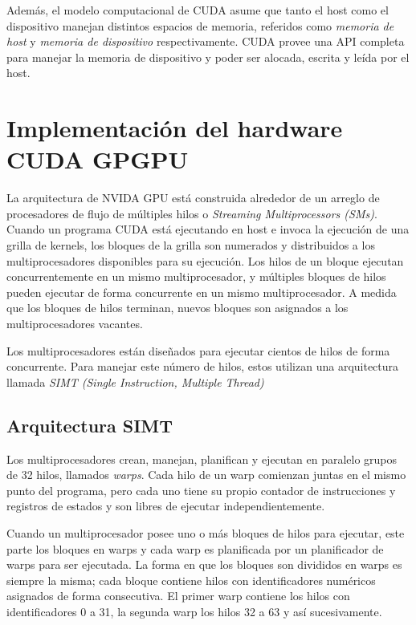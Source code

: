 \documentclass[a4paper,openright,12pt, oneside]{book}
\begin{document}
Adem\'as, el modelo computacional de CUDA asume que tanto el host como el dispositivo
manejan distintos espacios de memoria, referidos como \textit{memoria de host}
y \textit{memoria de dispositivo} respectivamente. CUDA provee una API completa
para manejar la memoria de dispositivo y poder ser alocada, escrita y le\'ida por 
el host.



\section{Implementaci\'on del hardware CUDA GPGPU}

La arquitectura de NVIDA GPU est\'a construida alrededor de un arreglo de
procesadores de flujo de m\'ultiples hilos o \textit{Streaming Multiprocessors (SMs)}.
Cuando un programa CUDA est\'a ejecutando en host e invoca la ejecuci\'on de una grilla
de kernels, los bloques de la grilla son numerados y distribuidos a los multiprocesadores
disponibles para su ejecuci\'on. Los hilos de un bloque ejecutan concurrentemente en
un mismo multiprocesador, y m\'ultiples bloques de hilos pueden ejecutar de forma
concurrente en un mismo multiprocesador. A medida que los bloques de hilos terminan,
nuevos bloques son asignados a los multiprocesadores vacantes.

Los multiprocesadores est\'an dise\~nados para ejecutar cientos de hilos de forma concurrente. 
Para manejar este n\'umero de hilos, estos utilizan una arquitectura llamada 
\textit{SIMT (Single Instruction, Multiple Thread)}


\subsection{Arquitectura SIMT}

Los multiprocesadores crean, manejan, planifican y ejecutan en paralelo grupos de 32 hilos,
llamados \textit{warps}. Cada hilo de un warp comienzan juntas en el mismo punto del
programa, pero cada uno tiene su propio contador de instrucciones y registros de estados
y son libres de ejecutar independientemente.

Cuando un multiprocesador posee uno o m\'as bloques de hilos para ejecutar, este
parte los bloques en warps y cada warp es planificada por un planificador de warps para ser ejecutada. 
La forma en que los bloques son divididos en warps es siempre la misma; cada bloque contiene
hilos con identificadores num\'ericos asignados de forma consecutiva. El primer warp contiene
los hilos con identificadores 0 a 31, la segunda warp los hilos 32 a 63 y as\'i sucesivamente.
\end{document}
